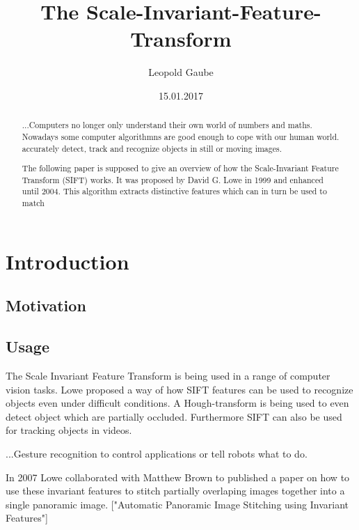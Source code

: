 \documentclass{article}
\begin{document}
	
		\title{The Scale-Invariant-Feature-Transform} 
		\author{Leopold Gaube}
		\date{15.01.2017} 
		\maketitle
		
	\begin{abstract}
		
	...Computers no longer only understand their own world of numbers and maths. Nowadays some computer algorithmns are good enough to cope with our human world. accurately detect, track and recognize objects in still or moving images. 
	
	The following paper is supposed to give an overview of how the Scale-Invariant Feature Transform (SIFT) works. It was proposed by David G. Lowe in 1999 and enhanced until 2004. This algorithm extracts distinctive features which can in turn be used to match 
	
	\end{abstract}
	
	
	
	\section{Introduction}
	\subsection{Motivation}
	
	
	
	
	\subsection{Usage}
	
	The Scale Invariant Feature Transform is being used in a range of computer vision tasks. 
	Lowe proposed a way of how SIFT features can be used to recognize objects even under difficult conditions. A Hough-transform is being used to even detect object which are partially occluded. Furthermore SIFT can also be used for tracking objects in videos.
		
	...Gesture recognition to control applications or tell robots what to do.
	
	In 2007 Lowe collaborated with Matthew Brown to published a paper on how to
	use these invariant features to stitch partially overlaping images together into a single panoramic image. ["Automatic Panoramic Image Stitching using Invariant Features"]
	
\end{document}
